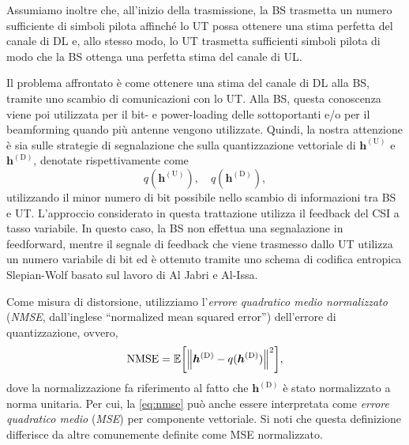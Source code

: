 Assumiamo inoltre che, all'inizio della trasmissione, la BS trasmetta un numero
sufficiente di simboli pilota affinché lo UT possa ottenere una stima perfetta
del canale di DL e, allo stesso modo, lo UT trasmetta sufficienti simboli
pilota di modo che la BS ottenga una perfetta stima del canale di UL.

Il problema affrontato è come ottenere una stima del canale di DL alla BS,
tramite uno scambio di comunicazioni con lo UT. Alla BS, questa conoscenza
viene poi utilizzata per il bit- e power-loading delle sottoportanti e/o per il
beamforming quando più antenne vengono utilizzate. Quindi, la nostra attenzione
è sia sulle strategie di segnalazione che sulla quantizzazione vettoriale di
\(\bm{h}^\mathrm{(U)}\) e \(\bm{h}^\mathrm{(D)}\), denotate rispettivamente
come
\begin{equation}
    q(\bm{h}^\mathrm{(U)}), \quad q(\bm{h}^\mathrm{(D)}),
\end{equation}
utilizzando il minor numero di bit possibile nello scambio di informazioni tra
BS e UT. L'approccio considerato in questa trattazione utilizza il feedback del
CSI a tasso variabile. In questo caso, la BS non effettua una segnalazione in
feedforward, mentre il segnale di feedback che viene trasmesso dallo UT
utilizza un numero variabile di bit ed è ottenuto tramite uno schema di
codifica entropica Slepian-Wolf basato sul lavoro di Al Jabri e
Al-Issa.\cite{10.1007/BFb0024445}

Come misura di distorsione, utilizziamo l'\textit{errore quadratico medio
normalizzato} (\textit{NMSE}, dall'inglese ``normalized mean squared error'')
dell'errore di quantizzazione, ovvero,
\begin{equation} \label{eq:nmse}
    \mathrm{NMSE} = \expect{
        \lnorm \bm{h}^\mathrm{(D)} - q(\bm{h}^\mathrm{(D)}) \rnorm^2
    },
\end{equation}
dove la normalizzazione fa riferimento al fatto che \(\bm{h}^\mathrm{(D)}\) è
stato normalizzato a norma unitaria. Per cui, la \eqref{eq:nmse} può anche
essere interpretata come \textit{errore quadratico medio} (\textit{MSE}) per
componente vettoriale. Si noti che questa definizione differisce da altre
comunemente definite come MSE normalizzato.


